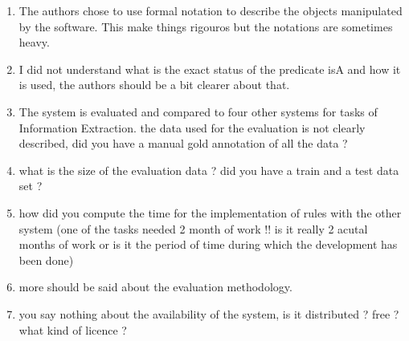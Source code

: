 \begin{enumerate}[leftmargin=0mm,label=\bfseries CommentR1.\arabic*]

  \item \label{Review1.1} 
The authors chose to use formal notation to describe the 
objects manipulated by the software. 
This make things rigouros but the notations are sometimes heavy.



\item \label{Review1.2} 
I did not understand what is the exact status of the predicate 
isA and how it is used, the authors should be a bit 
 clearer about that.


\item \label{Review1.3} 
The system is evaluated and compared to four other systems for 
tasks of Information Extraction.
the data used for the evaluation is not clearly described, 
did you have a manual gold annotation of all the data ?



\item \label{Review1.4} 
what is the size of the evaluation data ? 
did you have a train and a test data set ?


\item \label{Review1.5} 
how did you compute the time for the implementation of rules 
with the other system (one of the tasks needed 2 month of work 
!! is it really 2 acutal months of work or is it the period of 
time during which the development has been done)


\item \label{Review1.5} 
more should be said about the evaluation methodology.


\item \label{Review1.6}
you say nothing about the availability of the system, 
is it distributed ? free ? what kind of licence ?



\end{enumerate}

